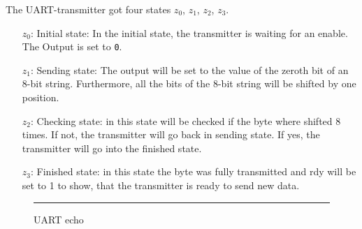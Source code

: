 The UART-transmitter got four states $z_0$, $z_1$, $z_2$, $z_3$.
\begin{itemize}


\item[$z_0$:] Initial state: In the initial state, the transmitter is waiting for an enable. The Output is set to \verb+0+.
\item[$z_1$:] Sending state: The output will be set to the value of the zeroth bit of an 8-bit string. Furthermore, all the bits of the 8-bit string will be shifted by one position.
\item[$z_2$:] Checking state: in this state will be checked if the byte where shifted 8 times. If not, the transmitter will go back in sending state. If yes, the transmitter will go into the finished state.
\item[$z_3$:] Finished state: in this state the byte was fully transmitted and rdy will be set to 1 to show, that the transmitter is ready to send new data.

\end{itemize}\newpage

\begin{figure}[h!]
    \begin{center}
        
        \caption{UART echo}
        \label{fig:as5-schematic}
        \vspace{1em}\hrule
    \end{center}
\end{figure}
